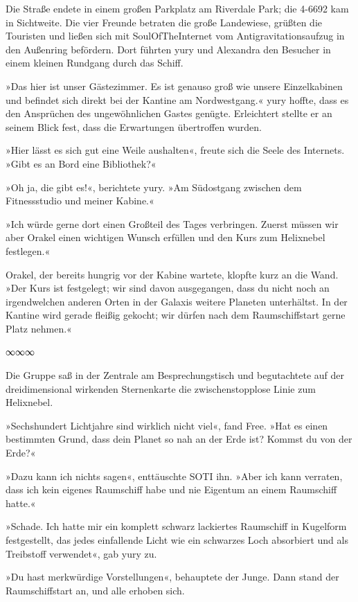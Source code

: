 Die Straße endete in einem großen Parkplatz am Riverdale Park; die 4-6692 kam in Sichtweite. Die vier Freunde betraten die große Landewiese, grüßten die Touristen und ließen sich mit SoulOfTheInternet vom Antigravitationsaufzug in den Außenring befördern. Dort führten yury und Alexandra den Besucher in einem kleinen Rundgang durch das Schiff.

»Das hier ist unser Gästezimmer. Es ist genauso groß wie unsere Einzelkabinen und befindet sich direkt bei der Kantine am Nordwestgang.« yury hoffte, dass es den Ansprüchen des ungewöhnlichen Gastes genügte. Erleichtert stellte er an seinem Blick fest, dass die Erwartungen übertroffen wurden.

»Hier lässt es sich gut eine Weile aushalten«, freute sich die Seele des Internets. »Gibt es an Bord eine Bibliothek?«

»Oh ja, die gibt es!«, berichtete yury. »Am Südostgang zwischen dem Fitnessstudio und meiner Kabine.«

»Ich würde gerne dort einen Großteil des Tages verbringen. Zuerst müssen wir aber Orakel einen wichtigen Wunsch erfüllen und den Kurs zum Helixnebel festlegen.«

Orakel, der bereits hungrig vor der Kabine wartete, klopfte kurz an die Wand. »Der Kurs ist festgelegt; wir sind davon ausgegangen, dass du nicht noch an irgendwelchen anderen Orten in der Galaxis weitere Planeten unterhältst. In der Kantine wird gerade fleißig gekocht; wir dürfen nach dem Raumschiffstart gerne Platz nehmen.«

\begin{center}
∞∞∞
\end{center}

Die Gruppe saß in der Zentrale am Besprechungstisch und begutachtete auf der dreidimensional wirkenden Sternenkarte die zwischenstopplose Linie zum Helixnebel.

»Sechshundert Lichtjahre sind wirklich nicht viel«, fand Free. »Hat es einen bestimmten Grund, dass dein Planet so nah an der Erde ist? Kommst du von der Erde?«

»Dazu kann ich nichts sagen«, enttäuschte SOTI ihn. »Aber ich kann verraten, dass ich kein eigenes Raumschiff habe und nie Eigentum an einem Raumschiff hatte.«

»Schade. Ich hatte mir ein komplett schwarz lackiertes Raumschiff in Kugelform festgestellt, das jedes einfallende Licht wie ein schwarzes Loch absorbiert und als Treibstoff verwendet«, gab yury zu.

»Du hast merkwürdige Vorstellungen«, behauptete der Junge. Dann stand der Raumschiffstart an, und alle erhoben sich.

